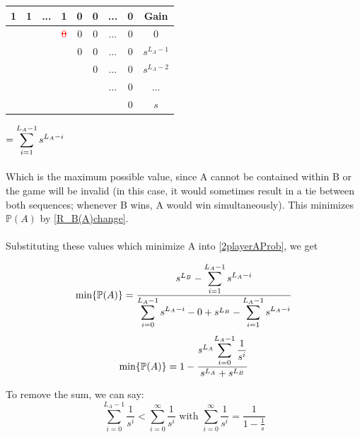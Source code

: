 \documentclass[english,12pt,a4paper,final]{article}
\begin{document}
\begin{tabular}{|cccccccc|c|}
	\hline
	1 & 1 & ... & 1 & 0 & 0 & ... & 0 & Gain \\
	\hline
	
	& & & \textcolor{red}{\sout{0}} & 0 & 0 & ... & 0 & $0$\\
	
	& & & & \textcolor{OliveGreen}{0} & \textcolor{OliveGreen}{0} & \textcolor{OliveGreen}{...} & \textcolor{OliveGreen}{0} & $s^{L_A-1}$ \\
	
	& & & & & \textcolor{OliveGreen}{0} & \textcolor{OliveGreen}{...} & \textcolor{OliveGreen}{0} & $s^{L_A-2}$ \\
	
	& & & & & & \textcolor{OliveGreen}{...} & \textcolor{OliveGreen}{0} & $...$ \\
	
	&  &  &  &  & &  & \textcolor{OliveGreen}{0} & $s$ \\
	\hline
\end{tabular}
$=\mathlarger{\sum_{i=1}^{L_A-1}s^{L_A-i}}$
\\\\
Which is the maximum possible value, since A cannot be contained within B or the game will be invalid (in this case, it would sometimes result in a tie between both sequences; whenever B wins, A would win simultaneously). This minimizes $\mathbb{P}(A)$ by \eqref{R_B(A)change}.
\\\\

Substituting these values which minimize A into \eqref{2playerAProb}, we get

\begin{equation*}
	\text{min}\{\mathbb{P}(A)\} = \frac{s^{L_B} - \mathlarger{\sum_{i=1}^{L_A-1}s^{L_A-i}}}{\mathlarger{\sum_{i=0}^{L_A-1}s^{L_A-i}} - 0 + s^{L_B} - \mathlarger{\sum_{i=1}^{L_A-1}s^{L_A-i}}}
\end{equation*}
\begin{equation}\label{PminDifferentLengths}
	\text{min}\{\mathbb{P}(A)\} = 1 - \frac{s^{L_A}\mathlarger{\sum_{i=0}^{L_A-1}\frac{1}{s^i}}}{s^{L_A} + s^{L_B}}
\end{equation}

To remove the sum, we can say:
\begin{equation*}
	\sum_{i=0}^{L_A-1}\frac{1}{s^i} < \sum_{i=0}^{\infty}\frac{1}{s^i} \text{  with  }\sum_{i=0}^{\infty}\frac{1}{s^i} = \frac{1}{1-\frac{1}{s}}
\end{equation*}
\end{document}
